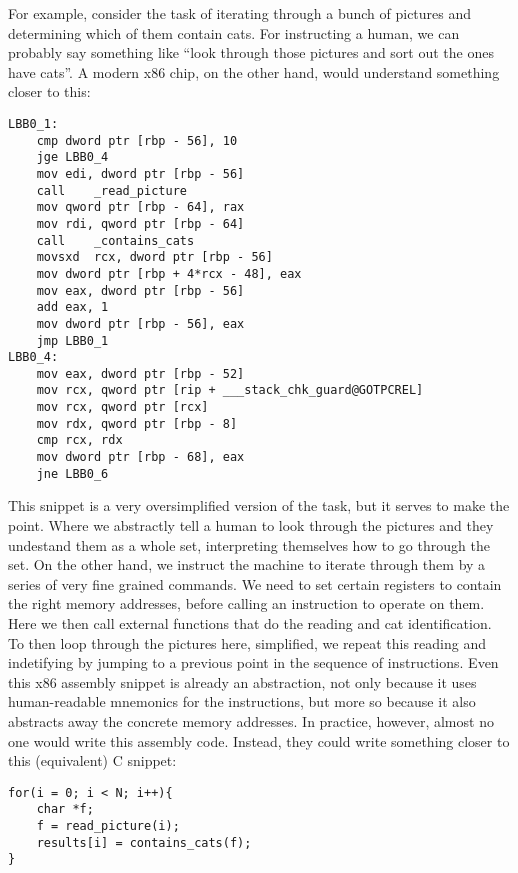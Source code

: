 For example, consider the task of iterating through a bunch of pictures and determining which of them contain cats.
For instructing a human, we can probably say something like ``look through those pictures and sort out the ones have cats''.
A modern x86 chip, on the other hand, would understand something closer to this:

\begin{verbatim}
LBB0_1:                                 
	cmp	dword ptr [rbp - 56], 10
	jge	LBB0_4
	mov	edi, dword ptr [rbp - 56]
	call	_read_picture
	mov	qword ptr [rbp - 64], rax
	mov	rdi, qword ptr [rbp - 64]
	call	_contains_cats
	movsxd	rcx, dword ptr [rbp - 56]
	mov	dword ptr [rbp + 4*rcx - 48], eax
	mov	eax, dword ptr [rbp - 56]
	add	eax, 1
	mov	dword ptr [rbp - 56], eax
	jmp	LBB0_1
LBB0_4:
	mov	eax, dword ptr [rbp - 52]
	mov	rcx, qword ptr [rip + ___stack_chk_guard@GOTPCREL]
	mov	rcx, qword ptr [rcx]
	mov	rdx, qword ptr [rbp - 8]
	cmp	rcx, rdx
	mov	dword ptr [rbp - 68], eax 
	jne	LBB0_6
\end{verbatim}

This snippet is a very oversimplified version of the task, but it serves to make the point.
Where we abstractly tell a human to look through the pictures and they undestand them as a whole set, interpreting themselves how to go through the set.
On the other hand, we instruct the machine to iterate through them by a series of very fine grained commands.
We need to set certain registers to contain the right memory addresses, before calling an instruction to operate on them.
Here we then call external functions that do the reading and cat identification.
To then loop through the pictures here, simplified, we repeat this reading and indetifying by jumping to a previous point in the sequence of instructions.
Even this x86 assembly snippet is already an abstraction, not only because it uses human-readable mnemonics for the instructions, but more so because it also abstracts away the concrete memory addresses.
In practice, however, almost no one would write this assembly code. Instead, they could write something closer to this (equivalent) C snippet:
\begin{verbatim}
for(i = 0; i < N; i++){
    char *f;
    f = read_picture(i);
    results[i] = contains_cats(f); 
}
\end{verbatim}

